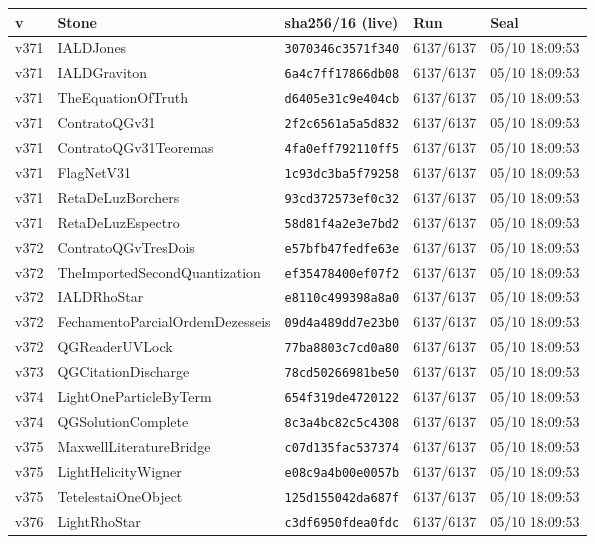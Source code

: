 \documentclass[11pt]{article}
\theoremstyle{definition}\newtheorem{deriv}{Derivation}
\begin{document}
{\small\begin{longtable}{@{}lllll@{}}\toprule v & Stone & sha256/16 (live) & Run & Seal \\ \midrule\endhead 
v371 & IALDJones & \texttt{3070346c3571f340} & 6137/6137 & 05/10 18:09:53 \\
v371 & IALDGraviton & \texttt{6a4c7ff17866db08} & 6137/6137 & 05/10 18:09:53 \\
v371 & TheEquationOfTruth & \texttt{d6405e31c9e404cb} & 6137/6137 & 05/10 18:09:53 \\
v371 & ContratoQGv31 & \texttt{2f2c6561a5a5d832} & 6137/6137 & 05/10 18:09:53 \\
v371 & ContratoQGv31Teoremas & \texttt{4fa0eff792110ff5} & 6137/6137 & 05/10 18:09:53 \\
v371 & FlagNetV31 & \texttt{1c93dc3ba5f79258} & 6137/6137 & 05/10 18:09:53 \\
v371 & RetaDeLuzBorchers & \texttt{93cd372573ef0c32} & 6137/6137 & 05/10 18:09:53 \\
v371 & RetaDeLuzEspectro & \texttt{58d81f4a2e3e7bd2} & 6137/6137 & 05/10 18:09:53 \\
v372 & ContratoQGvTresDois & \texttt{e57bfb47fedfe63e} & 6137/6137 & 05/10 18:09:53 \\
v372 & TheImportedSecondQuantization & \texttt{ef35478400ef07f2} & 6137/6137 & 05/10 18:09:53 \\
v372 & IALDRhoStar & \texttt{e8110c499398a8a0} & 6137/6137 & 05/10 18:09:53 \\
v372 & FechamentoParcialOrdemDezesseis & \texttt{09d4a489dd7e23b0} & 6137/6137 & 05/10 18:09:53 \\
v372 & QGReaderUVLock & \texttt{77ba8803c7cd0a80} & 6137/6137 & 05/10 18:09:53 \\
v373 & QGCitationDischarge & \texttt{78cd50266981be50} & 6137/6137 & 05/10 18:09:53 \\
v374 & LightOneParticleByTerm & \texttt{654f319de4720122} & 6137/6137 & 05/10 18:09:53 \\
v374 & QGSolutionComplete & \texttt{8c3a4bc82c5c4308} & 6137/6137 & 05/10 18:09:53 \\
v375 & MaxwellLiteratureBridge & \texttt{c07d135fac537374} & 6137/6137 & 05/10 18:09:53 \\
v375 & LightHelicityWigner & \texttt{e08c9a4b00e0057b} & 6137/6137 & 05/10 18:09:53 \\
v375 & TetelestaiOneObject & \texttt{125d155042da687f} & 6137/6137 & 05/10 18:09:53 \\
v376 & LightRhoStar & \texttt{c3df6950fdea0fdc} & 6137/6137 & 05/10 18:09:53 \\

\end{longtable}}
\end{document}
